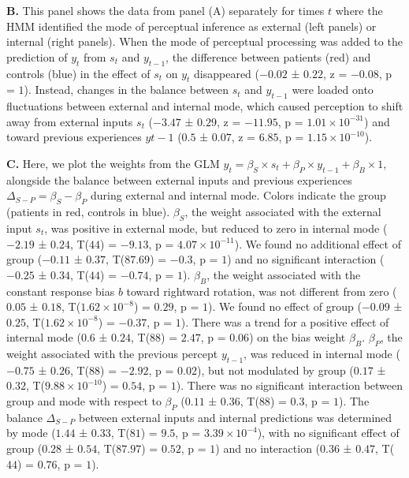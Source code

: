 \documentclass[
]{article}
\begin{document}
\textbf{B.} This panel shows the data from panel (A) separately for
times \(t\) where the HMM identified the mode of perceptual inference as
external (left panels) or internal (right panels). When the mode of
perceptual processing was added to the prediction of \(y_t\) from
\(s_t\) and \(y_{t-1}\), the difference between patients (red) and
controls (blue) in the effect of \(s_t\) on \(y_t\) disappeared
(\(-0.02\) ± \(0.22\), z = \(-0.08\), p = \(1\)). Instead, changes in
the balance between \(s_t\) and \(y_{t-1}\) were loaded onto
fluctuations between external and internal mode, which caused perception
to shift away from external inputs \(s_t\) (\(-3.47\) ± \(0.29\), z =
\(-11.95\), p = \(\ensuremath{1.01\times 10^{-31}}\)) and toward
previous experiences \(y{t-1}\) (\(0.5\) ± \(0.07\), z = \(6.85\), p =
\(\ensuremath{1.15\times 10^{-10}}\)).

\textbf{C.} Here, we plot the weights from the GLM
\(y_t = \beta_S \times s_t + \beta_P \times y_{t-1} + \beta_B \times 1\),
alongside the balance between external inputs and previous experiences
\(\Delta_{S-P} = \beta_S - \beta_P\) during external and internal mode.
Colors indicate the group (patients in red, controls in blue).
\(\beta_S\), the weight associated with the external input \(s_t\), was
positive in external mode, but reduced to zero in internal mode
(\(-2.19\) ± \(0.24\), T(\(44\)) = \(-9.13\), p =
\(\ensuremath{4.07\times 10^{-11}}\)). We found no additional effect of
group (\(-0.11\) ± \(0.37\), T(\(87.69\)) = \(-0.3\), p = \(1\)) and no
significant interaction (\(-0.25\) ± \(0.34\), T(\(44\)) = \(-0.74\), p
= \(1\)). \(\beta_B\), the weight associated with the constant response
bias \(b\) toward rightward rotation, was not different from zero
(\(0.05\) ± \(0.18\), T(\(\ensuremath{1.62\times 10^{-8}}\)) = \(0.29\),
p = \(1\)). We found no effect of group (\(-0.09\) ± \(0.25\),
T(\(\ensuremath{1.62\times 10^{-8}}\)) = \(-0.37\), p = \(1\)). There
was a trend for a positive effect of internal mode (\(0.6\) ± \(0.24\),
T(\(88\)) = \(2.47\), p = \(0.06\)) on the bias weight \(\beta_B\).
\(\beta_P\), the weight associated with the previous percept
\(y_{t-1}\), was reduced in internal mode (\(-0.75\) ± \(0.26\),
T(\(88\)) = \(-2.92\), p = \(0.02\)), but not modulated by group
(\(0.17\) ± \(0.32\), T(\(\ensuremath{9.88\times 10^{-10}}\)) =
\(0.54\), p = \(1\)). There was no significant interaction between group
and mode with respect to \(\beta_P\) (\(0.11\) ± \(0.36\), T(\(88\)) =
\(0.3\), p = \(1\)). The balance \(\Delta_{S-P}\) between external
inputs and internal predictions was determined by mode (\(1.44\) ±
\(0.33\), T(\(81\)) = \(9.5\), p = \(\ensuremath{3.39\times 10^{-4}}\)),
with no significant effect of group (\(0.28\) ± \(0.54\), T(\(87.97\)) =
\(0.52\), p = \(1\)) and no interaction (\(0.36\) ± \(0.47\), T(\(44\))
= \(0.76\), p = \(1\)).
\end{document}
